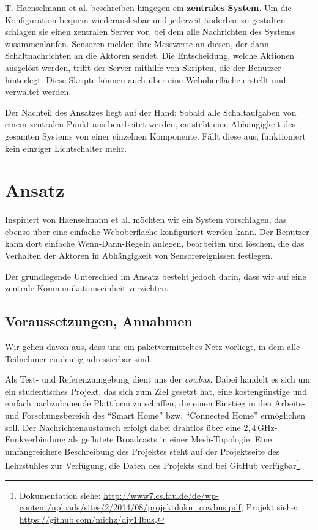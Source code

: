 \documentclass[conference]{IEEEtran}
\begin{document}
    T. Haenselmann et al. \cite{haenselmann2007skriptbasierte}
    beschreiben hingegen ein \textbf{zentrales System}.
    Um die Konfiguration bequem wiederauslesbar und jederzeit änderbar
    zu gestalten schlagen sie einen zentralen Server vor,
    bei dem alle Nachrichten des Systems zusammenlaufen.
    Sensoren melden ihre Messwerte an diesen, der dann Schaltnachrichten
    an die Aktoren sendet.
    Die Entscheidung, welche Aktionen ausgelöst werden, trifft der Server
    mithilfe von Skripten, die der Benutzer hinterlegt.
    Diese Skripte können auch über eine Weboberfläche erstellt und
    verwaltet werden.

    Der Nachteil des Ansatzes liegt auf der Hand:
    Sobald alle Schaltaufgaben von einem zentralen Punkt aus bearbeitet
    werden, entsteht eine Abhängigkeit des gesamten Systems von einer
    einzelnen Komponente.
    Fällt diese aus, funktioniert kein einziger Lichtschalter mehr.


\section{Ansatz}
    Inspiriert von Haenselmann et al. \cite{haenselmann2007skriptbasierte}
    möchten wir ein System vorschlagen,
    das ebenso über eine einfache Weboberfläche konfiguriert werden kann.
    Der Benutzer kann dort einfache Wenn-Dann-Regeln anlegen, bearbeiten und
    löschen, die das Verhalten der Aktoren in Abhängigkeit von Sensorereignissen
    festlegen.

    Der grundlegende Unterschied im Ansatz besteht jedoch darin,
    dass wir auf eine zentrale Kommunikationseinheit verzichten.

    \subsection{Voraussetzungen, Annahmen}
        Wir gehen davon aus, dass uns ein paketvermitteltes Netz vorliegt,
        in dem alle Teilnehmer eindeutig adressierbar sind.

        Als Test- und Referenzumgebung dient uns der \emph{cowbus}.
        Dabei handelt es sich um ein studentisches Projekt,
        das sich zum Ziel gesetzt hat,
        eine kostengünstige und einfach nachzubauende Plattform zu schaffen,
        die einen Einstieg in den Arbeits- und Forschungsbereich des
        \enquote{Smart Home} bzw. \enquote{Connected Home} ermöglichen soll.
        Der Nachrichtenaustausch erfolgt dabei drahtlos über eine
        $2,4$\,GHz-Funkverbindung als geflutete Broadcasts in einer
        Mesh-Topologie.
        Eine umfangreichere Beschreibung des Projektes
        steht auf der Projektseite des Lehrstuhles zur Verfügung,
        die Daten des Projekts sind bei GitHub
        verfügbar\footnote{Dokumentation siehe: \url{http://www7.cs.fau.de/de/wp-content/uploads/sites/2/2014/08/projektdoku_cowbus.pdf}; Projekt siehe: \url{https://github.com/michz/diy14bus}.}.
\end{document}
